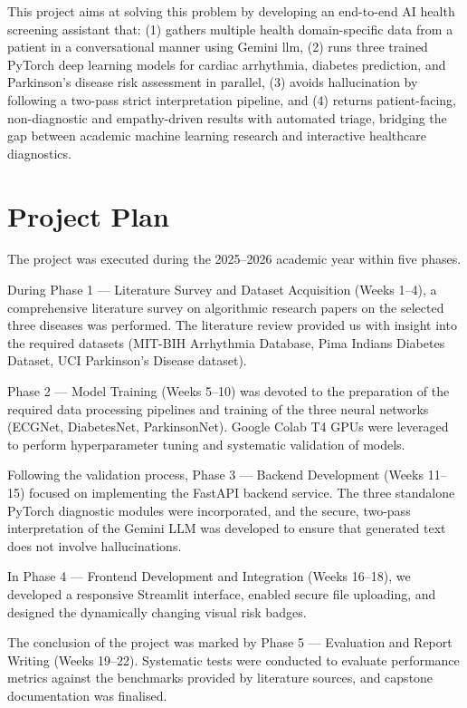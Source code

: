 This project aims at solving this problem by developing an end-to-end AI health screening assistant that:
(1) gathers multiple health domain-specific data from a patient in a conversational manner using Gemini \ac{llm},
(2) runs three trained PyTorch deep learning models for cardiac arrhythmia, diabetes prediction, and Parkinson's disease risk assessment in parallel,
(3) avoids hallucination by following a two-pass strict interpretation pipeline,
and (4) returns patient-facing, non-diagnostic and empathy-driven results with automated triage, bridging the gap between academic machine learning research and interactive healthcare diagnostics.

\section{Project Plan}

The project was executed during the 2025--2026 academic year within five phases.

During Phase 1 --- Literature Survey and Dataset Acquisition (Weeks 1--4), a comprehensive literature survey on algorithmic research papers on the selected three diseases was performed. The literature review provided us with insight into the required datasets (MIT-BIH Arrhythmia Database, Pima Indians Diabetes Dataset, UCI Parkinson's Disease dataset).

Phase 2 --- Model Training (Weeks 5--10) was devoted to the preparation of the required data processing pipelines and training of the three neural networks (ECGNet, DiabetesNet, ParkinsonNet). Google Colab T4 GPUs were leveraged to perform hyperparameter tuning and systematic validation of models.

Following the validation process, Phase 3 --- Backend Development (Weeks 11--15) focused on implementing the FastAPI backend service. The three standalone PyTorch diagnostic modules were incorporated, and the secure, two-pass interpretation of the Gemini LLM was developed to ensure that generated text does not involve hallucinations.

In Phase 4 --- Frontend Development and Integration (Weeks 16--18), we developed a responsive Streamlit interface, enabled secure file uploading, and designed the dynamically changing visual risk badges.

The conclusion of the project was marked by Phase 5 --- Evaluation and Report Writing (Weeks 19--22). Systematic tests were conducted to evaluate performance metrics against the benchmarks provided by literature sources, and capstone documentation was finalised.
